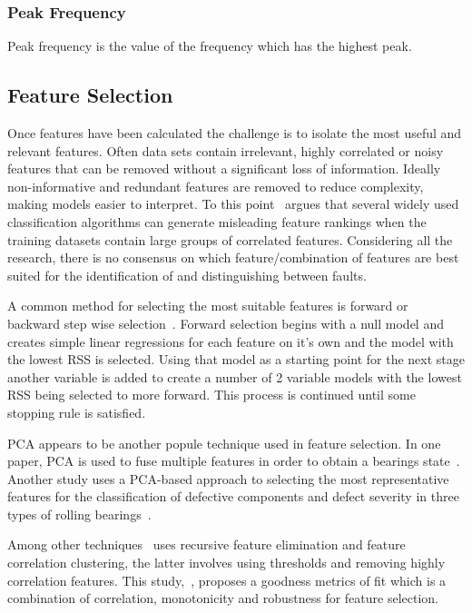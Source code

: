 \documentclass[]{article}
\begin{document}
\subsubsection*{Peak Frequency}
Peak frequency is the value of the frequency which has the highest peak.
\subsection{Feature Selection}
Once features have been calculated the challenge is to isolate the most useful and relevant features. Often data sets contain irrelevant, highly correlated or noisy features that can be removed without a significant loss of information. Ideally non-informative and redundant features are removed to reduce complexity, making models easier to interpret. To this point~\cite{tolocsi2011classification} argues that several widely used classification algorithms can generate misleading feature rankings when the training datasets contain large groups of correlated features. Considering all the research, there is no consensus on which feature/combination of features are best suited for the identification of and distinguishing between faults. 

A common method for selecting the most suitable features is forward or backward step wise selection~\cite{james2013introduction}. Forward selection begins with a null model and creates simple linear regressions for each feature on it's own and the model with the lowest RSS is selected. Using that model as a starting point for the next stage another variable is added to create a number of 2 variable models with the lowest RSS being selected to more forward. This process is continued until some stopping rule is satisfied.

\gls{PCA} appears to be another popule technique used in feature selection. In one paper, PCA is used to fuse multiple features in order to obtain a bearings state~\cite{lu2016degradation}. Another study uses a PCA-based approach to selecting the most representative features for the classification of defective components and defect severity in three types of rolling bearings~\cite{malhi2004pca}. 

Among other techniques~\cite{buckley2023feature} uses recursive feature elimination and feature correlation clustering, the latter involves using thresholds and removing highly correlation features. This study,~\cite{zhang2016degradation}, proposes a goodness metrics of fit which is a combination of correlation, monotonicity and robustness for feature selection.
\end{document}
